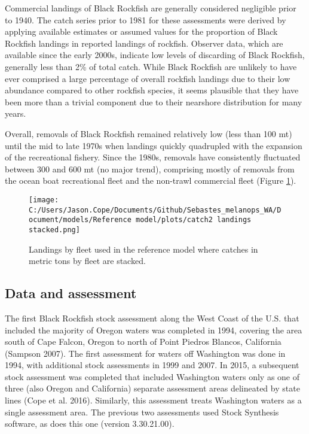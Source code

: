 \documentclass[11pt,
  english,
  letterpaper,
]{article}
\begin{document}
Commercial landings of Black Rockfish are generally considered negligible prior to 1940. The catch series prior to 1981 for these assessments were derived by applying available estimates or assumed values for the proportion of Black Rockfish landings in reported landings of rockfish. Observer data, which are available since the early 2000s, indicate low levels of discarding of Black Rockfish, generally less than 2\% of total catch. While Black Rockfish are unlikely to have ever comprised a large percentage of overall rockfish landings due to their low abundance compared to other rockfish species, it seems plausible that they have been more than a trivial component due to their nearshore distribution for many years.

Overall, removals of Black Rockfish remained relatively low (less than 100 mt) until the mid to late 1970s when landings quickly quadrupled with the expansion of the recreational fishery. Since the 1980s, removals have consistently fluctuated between 300 and 600 mt (no major trend), comprising mostly of removals from the ocean boat recreational fleet and the non-trawl commercial fleet (Figure \ref{fig:es-catch}).



\begin{figure}
\centering
\texttt{[image: C:/Users/Jason.Cope/Documents/Github/Sebastes\_melanops\_WA/Document/models/Reference model/plots/catch2 landings stacked.png]}
\caption{Landings by fleet used in the reference model where catches in metric tons by fleet are stacked.\label{fig:es-catch}}
\end{figure}

\clearpage

\hypertarget{data-and-assessment}{%
\subsection*{Data and assessment}\label{data-and-assessment}}

The first Black Rockfish stock assessment along the West Coast of the U.S. that included the majority of Oregon waters was completed in 1994, covering the area south of Cape Falcon, Oregon to north of Point Piedros Blancos, California (Sampson 2007). The first assessment for waters off Washington was done in 1994, with additional stock assessments in 1999 and 2007. In 2015, a subsequent stock assessment was completed that included Washington waters only as one of three (also Oregon and California) separate assessment areas delineated by state lines (Cope et al. 2016). Similarly, this assessment treats Washington waters as a single assessment area. The previous two assessments used Stock Synthesis software, as does this one (version 3.30.21.00).
\end{document}
